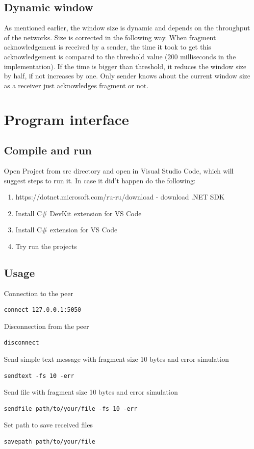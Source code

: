 \documentclass{article}
\begin{document}
\subsection{Dynamic window}
As mentioned earlier, the window size is dynamic and depends on the throughput of the networks.\newline
Size is corrected in the following way. When fragment acknowledgement is received by a sender,   the time it took to get this acknowledgement is compared to the threshold value (200 milliseconds in the implementation). If the time is bigger than threshold, it reduces the window size by half, if not increases by one. Only sender knows about the current window size as a receiver just acknowledges fragment or not. 

\pagebreak

\section{Program interface}
\subsection{Compile and run}

Open Project from src directory and open in Visual Studio Code, which will suggest steps to run it. In case it did't happen do the following:
\begin{enumerate}
\item https://dotnet.microsoft.com/ru-ru/download - download .NET SDK
\item Install C\# DevKit extension for VS Code
\item Install C\# extension for VS Code
\item Try run the projects
\end{enumerate}

\subsection{Usage}
Connection to the peer
\begin{lstlisting}
connect 127.0.0.1:5050
\end{lstlisting}
Disconnection from the peer
\begin{lstlisting}
disconnect
\end{lstlisting}
Send simple text message with fragment size 10 bytes and error simulation
\begin{lstlisting}
sendtext -fs 10 -err
\end{lstlisting}
Send file with fragment size 10 bytes and error simulation
\begin{lstlisting}
sendfile path/to/your/file -fs 10 -err
\end{lstlisting}
Set path to save received files
\begin{lstlisting}
savepath path/to/your/file 
\end{lstlisting}
\newpage
\end{document}
